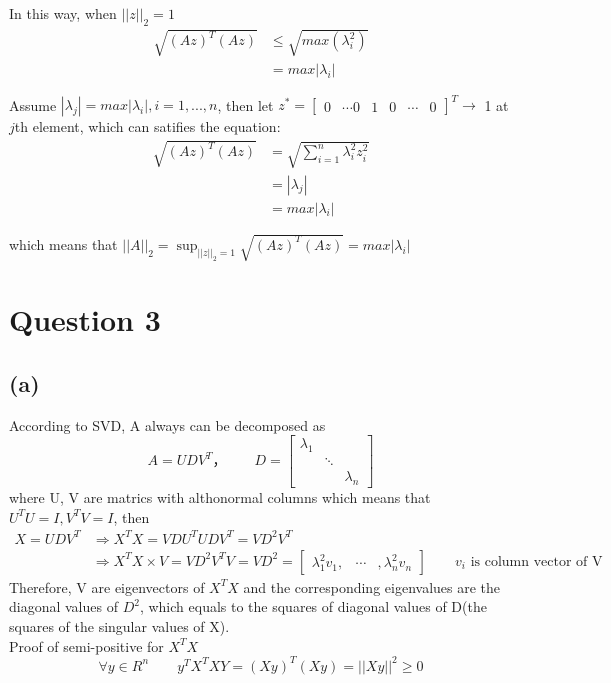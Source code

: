 \documentclass{article}\usepackage[]{graphicx}\usepackage[]{color}
\begin{document}
In this way, when $||z||_2=1$
\begin{align*}
  \sqrt{(Az)^T(Az)}&\leq \sqrt{max(\lambda_i^2)}\\
                   &=max|\lambda_i|
  \end{align*}
  
  
  Assume $|\lambda_j|=max|\lambda_i|, i=1,...,n$, then let $z^*=\begin{bmatrix}0&\cdots0&1&0&\cdots&0\end{bmatrix}^T\longrightarrow$ 1 at $j$th element, which can satifies the equation:
  \begin{align*}
  \sqrt{(Az)^T(Az)}&=\sqrt{\sum_{i=1}^{n}\lambda_i^2z_i^2}\\
                   &=|\lambda_j|\\
                   &=max|\lambda_i|
  \end{align*}
  
which means that $||A||_2=\sup_{||z||_2=1}\sqrt{(Az)^T(Az)}=max|\lambda_i|$ \\

\section{Question 3}
\subsection{(a)}
According to SVD, A always can be decomposed as 
$$A=UDV^T，\qquad D=\begin{bmatrix}\lambda_1&&\\&\ddots&\\&&\lambda_n\end{bmatrix}$$
where U, V are matrics with althonormal columns which means that $U^TU=I, V^TV=I$, then 
\begin{align*}
  X=UDV^T&\Longrightarrow X^TX=VDU^TUDV^T=VD^2V^T\\
         &\Longrightarrow X^TX\times V=VD^2V^TV=VD^2=\begin{bmatrix}\lambda_1^2v_1,&\cdots&,\lambda_n^2v_n\end{bmatrix}\qquad
         \text{$v_i$ is column vector of V}
  \end{align*}
Therefore, V are eigenvectors of $X^TX$ and the corresponding eigenvalues are the diagonal values of $D^2$, which equals to the squares of diagonal values of D{(the squares of the singular values of X)}.\\

Proof of semi-positive for $X^TX$ 
$$\forall y \in R^n \qquad y^TX^TXY=(Xy)^T(Xy)=||Xy||^2\geq 0$$
\end{document}
